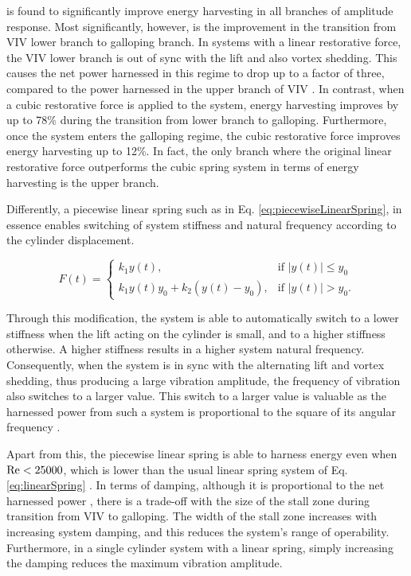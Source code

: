 \documentclass[oneside]{utmthesis}
\begin{document}
\noindent is found to significantly improve energy harvesting in all branches of amplitude response. Most significantly, however, is the improvement in the transition from VIV lower branch to galloping branch. In systems with a linear restorative force, the VIV lower branch is out of sync with the lift and also vortex shedding. This causes the net power harnessed in this regime to drop up to a factor of three, compared to the power harnessed in the upper branch of VIV \citep{Sun2018,Ma2018}. In contrast, when a cubic restorative force is applied to the system, energy harvesting improves by up to 78\% during the transition from lower branch to galloping. Furthermore, once the system enters the galloping regime, the cubic restorative force improves energy harvesting up to 12\%. In fact, the only branch where the original linear restorative force outperforms the cubic spring system in terms of energy harvesting is the upper branch.

Differently, a piecewise linear spring such as in Eq. \ref{eq:piecewiseLinearSpring}, in essence enables switching of system stiffness and natural frequency according to the cylinder displacement.

\begin{equation}
  F(t)=\begin{cases}
    k_{1} y(t),                              & \text{if $|y(t)| \leq y_{0}$}\\
    k_{1} y(t) y_{0} + k_{2} (y(t) - y_{0}), & \text{if $|y(t)| > y_{0}$}.
  \end{cases}
  \label{eq:piecewiseLinearSpring}
\end{equation}

\noindent Through this modification, the system is able to automatically switch to a lower stiffness when the lift acting on the cylinder is small, and to a higher stiffness otherwise. A higher stiffness results in a higher system natural frequency. Consequently, when the system is in sync with the alternating lift and vortex shedding, thus producing a large vibration amplitude, the frequency of vibration also switches to a larger value. This switch to a larger value is valuable as the harnessed power from such a system is proportional to the square of its angular frequency \citep{Ma2018}.

Apart from this, the piecewise linear spring is able to harness energy even when $\text{Re} < 25000$, which is lower than the usual linear spring system of Eq. \ref{eq:linearSpring} \citep{Sun2016}. In terms of damping, although it is proportional to the net harnessed power \citep{Ma2018}, there is a trade-off with the size of the stall zone during transition from VIV to galloping. The width of the stall zone increases with increasing system damping, and this reduces the system's range of operability. Furthermore, in a single cylinder system with a linear spring, simply increasing the damping reduces the maximum vibration amplitude.
\end{document}
